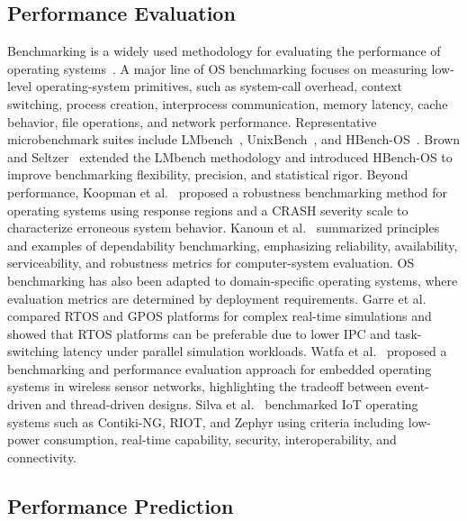 \documentclass[sigplan,10pt]{acmart}
\begin{document}
\subsection{Performance Evaluation}
Benchmarking is a widely used methodology for evaluating the performance of operating systems~\cite{hatt2007benchmarking}. 
A major line of OS benchmarking focuses on measuring low-level operating-system primitives, such as system-call overhead, context switching, process creation, interprocess communication, memory latency, cache behavior, file operations, and network performance. 
Representative microbenchmark suites include LMbench~\cite{brown1997operating}, UnixBench~\cite{smith2011byte}, and HBench-OS~\cite{hatt2007benchmarking}. 
Brown and Seltzer~\cite{brown1997operating} extended the LMbench methodology and introduced HBench-OS to improve benchmarking flexibility, precision, and statistical rigor. 
Beyond performance, Koopman et al.~\cite{koopman1997comparing} proposed a robustness benchmarking method for operating systems using response regions and a CRASH severity scale to characterize erroneous system behavior. 
Kanoun et al.~\cite{kanoun2006dependability} summarized principles and examples of dependability benchmarking, emphasizing reliability, availability, serviceability, and robustness metrics for computer-system evaluation. OS benchmarking has also been adapted to domain-specific operating systems, where evaluation metrics are determined by deployment requirements. 
Garre et al.~\cite{garre2014performance} compared RTOS and GPOS platforms for complex real-time simulations and showed that RTOS platforms can be preferable due to lower IPC and task-switching latency under parallel simulation workloads. 
Watfa et al.~\cite{watfa2014benchmarking} proposed a benchmarking and performance evaluation approach for embedded operating systems in wireless sensor networks, highlighting the tradeoff between event-driven and thread-driven designs. 
Silva et al.~\cite{silva2019operating} benchmarked IoT operating systems such as Contiki-NG, RIOT, and Zephyr using criteria including low-power consumption, real-time capability, security, interoperability, and connectivity. 

\subsection{Performance Prediction}
\label{subsec:rw-performance-prediction}
\end{document}
